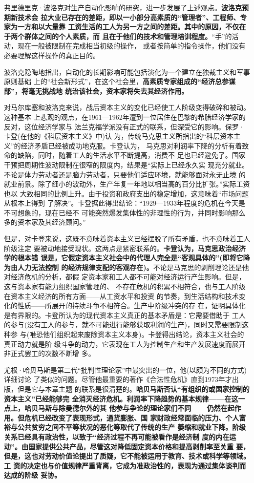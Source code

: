 弗里德里克·波洛克对生产自动化影响的研究，进一步发展了上述观点。\textbf{波洛克预期新技术会
拉大业已存在的差距，即以一小部分高素质的“管理者”、工程师、专家为一方和以大量靠
工资生活的工人为另一方之间的差距。其中的原因，不仅在于两个群体之间的个人素质，而
且在于他们的技术和管理培训程度。}“手”的活动，现在一般被限制在完成相当初级的操作，
或者按简单的指令操作，他们没有必要理解这样操作的真正目的。

波洛克隐晦地指出，自动化的长期影响可能包括演化为一个建立在独裁主义和军事原则基础
上的“社会新形式”，在这个社会里，\textbf{高素质专家组成的“经济总参谋部”，将毫无挑战地
统治该社会，资本家将失去其经济作用。}

对马尔库塞和波洛克来说，战后资本主义的变化已经使工人阶级变得破碎和被动。这种基本
上悲观的观点，在1961—1962年遭到一位居住在巴黎的希腊经济学家的反对，这位经济学家与
法兰克福学派没有正式的联系，但深受它的影响。保罗·卡登(在他的《科层资本主义》中)认
为，传统马克思主义所指出的“科层资本主义”的经济矛盾已经被成功地克服。卡登认为，
马克思对利润率下降的分析有着致命的缺陷，同时，随着工人的生活水平不断提高，消费不
足也已经避免了。国家干预把周期性波动限制在很窄的限度内，结果是“实际上已经永久实
现充分就业。不论是体力劳动者还是脑力劳动者，只要他们适应环境，就能够面对永无止境
的就业前景。除了细小的波动外，生产年复一年地以相当高的百分比扩张。”实际工资也以
大致相同的比例上升。由于投资和政府支出的稳定增加，这意味着“市场问题从根本上得到
了解决”。卡登据此得出结论：“1929—1933年程度的危机在今天是不可想象的，现在已经不
可能突然爆发集体性的非理性的行为，并同时影响那么多的资本家及其经济顾问。”

但是，对卡登来说，这既不意味着资本主义已经摆脱了所有矛盾，也不意味着工人阶级注定
要被动地接受现状。这两点是紧密联系的。\textbf{卡登认为，马克思政治经济学的根本错
  误是，它假定资本主义社会中的代理人完全是“客观具体的”(即将它降为由人力无法控制
  的经济规律支配的客观存在)。}不论是马克思的剥削理论还是他对经济危机的分析，都假
定资本家和工人都不可能对经济运行产生影响。但是，这与资本家有能力组织国家管理的、
不存在危机的积累不相符合，也与工人阶级在资本主义经济的所有方面——从工资水平和投资
的节奏，到生活结构和技术变化的性质——所展开的持续斗争不相符合。生产中阶级冲突的存
在，证明具体化是有界限的。卡登所认为的现代资本主义真正的基本矛盾是：它需要借助于
工人的参与(没有工人的参与，就不可能进行能够获取利润的生产)，同时又需要限制这种参
与(唯恐他们组织起来废除资本主义本身)。卡登得出结论，资本主义社会的真正动力就是阶
级斗争的动力，它表现在工人为控制生产和生产发展速度而展开非正式罢工的次数不断增
多。

尤根·哈贝马斯是第二代“批判性理论家”中最突出的一位，他(以颇为不同的方式)详细讨论
了类似的问题。尽管他最重要的著作《合法性危机》直到1973年才出版，但是它与本章主题
的联系是很清楚的。\textbf{哈贝马斯否认“有组织的或国家控制的资本主义”已经能够完
  全消灭经济危机。利润率下降趋势的基本规律——在这一点上，哈贝马斯与除曼德尔外的其
  他参与争论的理论家们不同——仍然在起作用。但危机已经改变了表现形式，通货膨胀、国
  家财政经常面临的压力、个人富裕与公共贫穷之间不平等状况的恶化等取代了传统的生产
  萎缩和就业下降。阶级关系已经具有政治性，以致于“经济过程不再可能被看作是经济制
  度的内在运动”。由国家提供公共产品，尽管这对降低固定资本价格和提高剥削率至关重
  要，但是，这也对劳动价值论提出了质疑，它不能被运用于教育、技术或科学等领域。工
  资的决定也与价值规律严重背离，它成为准政治性的，表现为通过集体谈判而达成的阶级
  妥协。}

